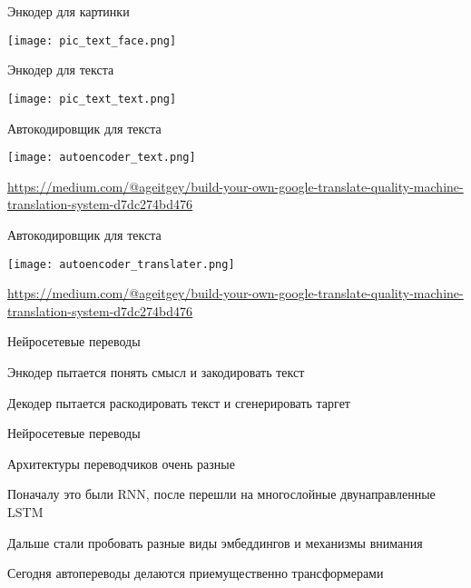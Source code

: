 \documentclass[notes,12pt, aspectratio=169]{beamer}
\newenvironment{wideitemize}{\itemize\addtolength{\itemsep}{10pt}}{\enditemize}
\begin{document}
\begin{frame}{Энкодер для картинки}
	\begin{center}
		\texttt{[image: pic\_text\_face.png]}
	\end{center}
\end{frame} 


\begin{frame}{Энкодер для текста}
	\begin{center}
		\texttt{[image: pic\_text\_text.png]}
	\end{center}
\end{frame} 


\begin{frame}{Автокодировщик для текста}
	\begin{center}
		\texttt{[image: autoencoder\_text.png]}
	\end{center}
	\vfill
\footnotesize  {\color{blue} \url{https://medium.com/@ageitgey/build-your-own-google-translate-quality-machine-translation-system-d7dc274bd476}} 
\end{frame} 


\begin{frame}{Автокодировщик для текста}
	\begin{center}
		\texttt{[image: autoencoder\_translater.png]}
	\end{center}
	\vfill
	\footnotesize  {\color{blue} \url{https://medium.com/@ageitgey/build-your-own-google-translate-quality-machine-translation-system-d7dc274bd476}} 
\end{frame} 


\begin{frame}{Нейросетевые переводы}
	\begin{wideitemize} 
		\item  Энкодер пытается понять смысл и закодировать текст 
		\item  Декодер пытается раскодировать текст и сгенерировать таргет
	\end{wideitemize} 
\end{frame} 


\begin{frame}{Нейросетевые переводы}
	\begin{wideitemize} 
		\item  Архитектуры переводчиков очень разные
		\item  Поначалу это были RNN, после перешли на многослойные двунаправленные LSTM
		\item  Дальше стали пробовать разные виды эмбеддингов и механизмы внимания
		\item  Сегодня автопереводы делаются приемущественно трансформерами 
	\end{wideitemize} 
\end{frame} 
\end{document}

